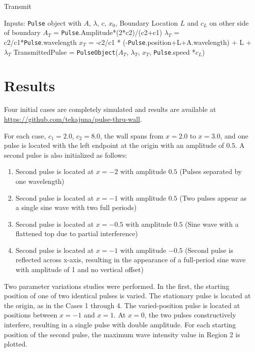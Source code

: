 \documentclass[twocolumn, letterpaper]{article}
\begin{document}
\begin{algorithm}
\caption{Transmit}
\label{alg:transmit}
\begin{algorithmic}[1]
\State Inputs: \texttt{Pulse} object with $A$, $\lambda$, $c$, $x_0$, 
\State Boundary Location $L$ and $c_L$ on other side of boundary
\State $A_T$ = \texttt{Pulse}.Amplitude*(2*c2)/(c2+c1)
\State $\lambda_T$ = c2/c1*\texttt{Pulse}.wavelength
\State $x_T$ = -c2/c1 * (-\texttt{Pulse}.position+L+A.wavelength) + L + $\lambda_T$
\State TransmittedPulse = \texttt{PulseObject}($A_T$, $\lambda_T$, $x_T$, \texttt{Pulse}.speed *$c_L$)


\end{algorithmic}
\end{algorithm}

\newpage
\section*{Results}
Four initial cases are completely simulated and results are available at \url{https://github.com/tekajuna/pulse-thru-wall}. 

For each case, $c_1 = 2.0$, $c_2 = 8.0$, the wall spans from $x=2.0$ to $x=3.0$, and one pulse is located with the left endpoint at the origin with an amplitude of $0.5$. A second pulse is also initialized as follows:

\begin{enumerate}
\item Second pulse is located at $x=-2$ with amplitude $0.5$ (Pulses separated by one wavelength)
\item Second pulse is located at $x=-1$ with amplitude $0.5$ (Two pulses appear as a single sine wave with two full periods)
\item Second pulse is located at $x=-0.5$ with amplitude $0.5$ (Sine wave with a flattened top due to partial interference)
\item Second pulse is located at $x=-1$ with amplitude $-0.5$ (Second pulse is reflected across x-axis, resulting in the appearance of a full-period sine wave with amplitude of 1 and no vertical offset)

\end{enumerate} 


Two parameter variations studies were performed. In the first, the starting position of one of two identical pulses is varied. The stationary pulse is located at the origin, as in the Cases 1 through 4. The varied-position pulse is located at positions between $x=-1$ and $x=1$. At $x=0$, the two pulses constructively interfere, resulting in a single pulse with double amplitude. For each starting position of the second pulse, the maximum wave intensity value in Region 2 is plotted.
\end{document}
